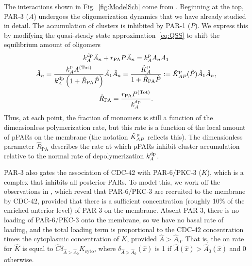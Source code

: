 \documentclass[11pt]{article}
\newcommand{\6}[1]{#1_{\text{6}}}
\newcommand{\3}[1]{#1_{\text{3}}}
\newcommand{\Tot}[1]{#1^\text{(Tot)}}
\begin{document}
The interactions shown in Fig.\ \ref{fig:ModelSch} come from \cite[Fig.~2]{lang2017proteins}. Beginning at the top, PAR-3 ($A$) undergoes the oligomerization dynamics that we have already studied in detail. The accumulation of clusters is inhibited by PAR-1 ($P$). We express this by modifying the quasi-steady state approximation\ \eqref{eq:QSS} to shift the equilibrium amount of oligomers
\begin{subequations}
\begin{gather}
\kdp_A \hat A_n +r_\text{PA} P \hat A_n = \kp_A A_n A_1\\
\label{eq:QSSP}
\hat A_n = \frac{\kp_A \Tot{A}}{\kdp_A\left(1+\hat R_\text{PA} \hat P\right)} \hat A_1 \hat A_n =\frac{\KhatpA}{1+\hat R_\text{PA} \hat P}:=\KhatpAP (\hat P )\hat A_1 \hat A_n,\\
\hat R_\text{PA} = \frac{r_\text{PA}\Tot{P}}{\kdp_A}. 
\end{gather}
\end{subequations}
Thus, at each point, the fraction of monomers is still a function of the dimensionless polymerization rate, but this rate is a function of the local amount of pPARs on the membrane (the notation $\hat{K}^\text{p}_{AP}$ reflects this). The dimensionless parameter $\hat R_\text{PA}$ describes the rate at which pPARs inhibit cluster accumulation relative to the normal rate of depolymerization $k^\text{dp}_A$. 

PAR-3 also gates the association of CDC-42 with PAR-6/PKC-3 ($K$), which is a complex that inhibits all posterior PARs. To model this, we work off the observations in \cite{sailer2015dynamic}, which reveal that PAR-6/PKC-3 are recruited to the membrane by CDC-42, provided that there is a sufficient concentration (roughly 10\% of the enriched anterior level) of PAR-3 on the membrane. Absent PAR-3, there is no loading of PAR-6/PKC-3 onto the membrane, so we have no basal rate of loading, and the total loading term is proportional to the CDC-42 concentration times the cytoplasmic concentration of $K$, provided $\hat A > \hat A_0$. That is, the on rate for $\hat K$ is equal to $\hat{C} \delta_{\hat A > \hat A_0}\hat K_\text{cyto}$, where $\delta_{\hat A > \hat A_0}(\hat x)$ is 1 if $\hat A(\hat x) > \hat A_0(\hat x)$ and 0 otherwise. 
\end{document}
